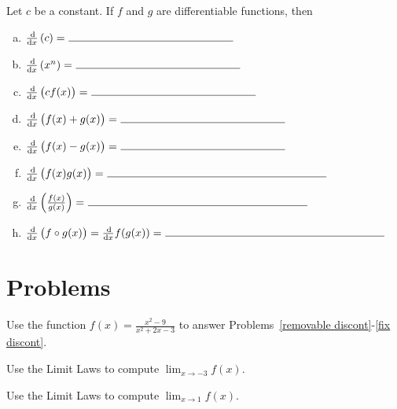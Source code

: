\documentclass[12pt]{amsart}
\begin{document}
\begin{thm}
  Let \(c\) be a constant.
  If \(f\) and \(g\) are differentiable functions, then
  \begin{enumerate}[(a)]
  \item
    \(\frac{\dif}{\dif x}\left(c\right) =\ \line(1,0){150}\)
    \vspace{.25in}
  \item
    \(\frac{\dif}{\dif x}\left(x^n\right) =\ \line(1,0){150}\)
    \vspace{.25in}
  \item
    \(\frac{\dif}{\dif x}\left(cf(x)\right) =\ \line(1,0){150}\)
    \vspace{.25in}
  \item
    \(\frac{\dif}{\dif x}\left(f(x) + g(x)\right) =\ \line(1,0){150}\)
    \vspace{.25in}
  \item
    \(\frac{\dif}{\dif x}\left(f(x) - g(x)\right) =\ \line(1,0){150}\)
    \vspace{.25in}
  \item
    \(\frac{\dif}{\dif x}\left(f(x)g(x)\right) =\ \line(1,0){200}\)
    \vspace{.25in}
  \item
    \(\frac{\dif}{\dif x}\left(\frac{f(x)}{g(x)}\right) =\ \line(1,0){200}\)
    \vspace{.25in}
  \item
    \(\frac{\dif}{\dif x}\left(f \circ g (x)\right) = \frac{\dif}{\dif x} f(g(x)) =\ \line(1,0){200}\)
  \end{enumerate}
\end{thm}

\section*{Problems}
\noindent
Use the function \(\displaystyle{f(x) = \frac{x^2 - 9}{x^2 + 2x - 3}}\) to answer Problems~\ref{removable discont}-\ref{fix discont}.

\begin{thm}[5 Points]\label{removable discont}
  Use the Limit Laws to compute \(\lim_{x \to -3} f(x)\).
\end{thm}

\vspace{2in}

\begin{thm}[5 Points]\label{infinite limit}
  Use the Limit Laws to compute \(\lim_{x \to 1} f(x)\).
\end{thm}
\end{document}
